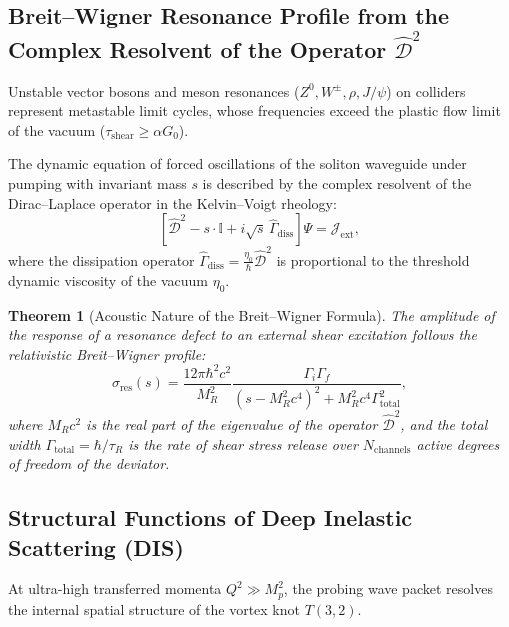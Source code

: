 \documentclass[12pt,a4paper]{article}
\newtheorem{theorem}{Theorem}
\begin{document}
\subsection{Breit--Wigner Resonance Profile from the Complex Resolvent of the Operator $\hat{\mathcal{D}}^2$}
	Unstable vector bosons and meson resonances ($Z^0, W^\pm, \rho, J/\psi$) on colliders represent metastable limit cycles, whose frequencies exceed the plastic flow limit of the vacuum ($\tau_{\text{shear}} \ge \alpha G_0$).
																			
	The dynamic equation of forced oscillations of the soliton waveguide under pumping with invariant mass $s$ is described by the complex resolvent of the Dirac--Laplace operator in the Kelvin--Voigt rheology:
	\begin{equation}
	\left[ \hat{\mathcal{D}}^2 - s \cdot \mathbb{I} + i \sqrt{s} \, \hat{\Gamma}_{\text{diss}} \right] \Psi = \mathcal{J}_{\text{ext}},
	\end{equation}
	where the dissipation operator $\hat{\Gamma}_{\text{diss}} = \frac{\eta_0}{\hbar} \hat{\mathcal{D}}^2$ is proportional to the threshold dynamic viscosity of the vacuum $\eta_0$.
																			
	\begin{theorem}[Acoustic Nature of the Breit--Wigner Formula]
	The amplitude of the response of a resonance defect to an external shear excitation follows the relativistic Breit--Wigner profile:
	\begin{equation}
	\sigma_{\text{res}}(s) = \frac{12\pi \hbar^2 c^2}{M_R^2} \frac{\Gamma_i \Gamma_f}{(s - M_R^2 c^4)^2 + M_R^2 c^4 \Gamma_{\text{total}}^2},
	\end{equation}
	where $M_R c^2$ is the real part of the eigenvalue of the operator $\hat{\mathcal{D}}^2$, and the total width $\Gamma_{\text{total}} = \hbar / \tau_R$ is the rate of shear stress release over $N_{\text{channels}}$ active degrees of freedom of the deviator.
	\end{theorem}
																			
\subsection{Structural Functions of Deep Inelastic Scattering (DIS)}
At ultra-high transferred momenta $Q^2 \gg M_p^2$, the probing wave packet resolves the internal spatial structure of the vortex knot $T(3,2)$.
\end{document}
